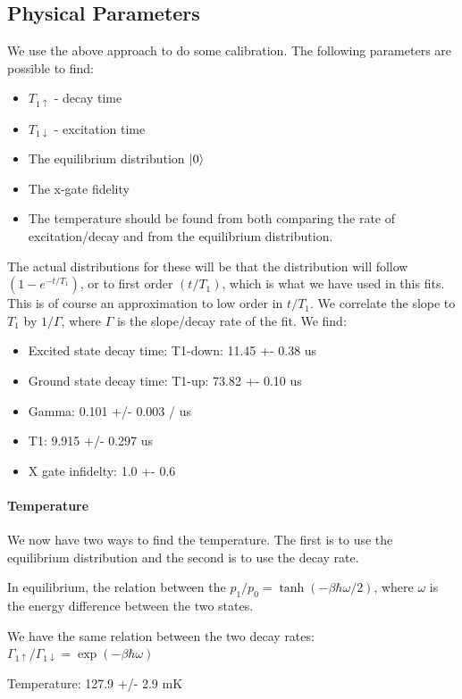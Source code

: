 \subsection{Physical Parameters}
We use the above approach to do some calibration. The following parameters are possible to find:
\begin{itemize}
\item $T_{1\uparrow}$ - decay time
\item $T_{1\downarrow}$ - excitation time 
\item The equilibrium distribution $\ket{0}$
\item The x-gate fidelity 
\item The temperature should be found from both comparing the rate of excitation/decay and from the equilibrium distribution.
\end{itemize}

The actual distributions for these will be that the distribution will follow $(1 - e^{-t/T_1})$, or to first order $(t/T_1)$, which is what we have used in this fits. This is of course an approximation to low order in $t/T_1$. We correlate the slope to $T_1$ by $1 / \Gamma$, where $\Gamma$ is the slope/decay rate of the fit.
We find:
\begin{itemize}
    \item Excited state decay time: T1-down: 11.45 +- 0.38 us
    \item Ground  state decay time: T1-up: 73.82 +- 0.10 us
    \item Gamma: 	 0.101 +/- 0.003 / us
    \item T1: 	 9.915 +/- 0.297 us
    \item X gate infidelty: 	 1.0 +- 0.6 %
\end{itemize}

\paragraph{Temperature}
We now have two ways to find the temperature. The first is to use the equilibrium distribution and the second is to use the decay rate.

In equilibrium, the relation between the $p_1/p_0 = \tanh(-\beta \hbar \omega / 2)$, where $\omega$ is the energy difference between the two states.

We have the same relation between the two decay rates: $\Gamma_{1\uparrow} / \Gamma_{1\downarrow} = \exp(-\beta \hbar \omega)$

Temperature: 	 127.9 +/- 2.9 mK

